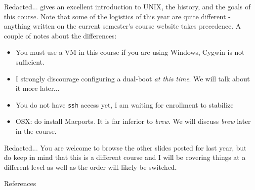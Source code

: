 \begin{frame}{Redacted...}
  \href{http://www.cs.cornell.edu/courses/cs2043/2015sp/lectures/lecture01.pdf}{}
  gives an excellent introduction to UNIX, the history, and the goals of this course. Note that some of the
  logistics of this year are quite different \-- anything written on the current semester's course website
  takes precedence.  A couple of notes about the differences:

  \begin{itemize}
    \item You must use a VM in this course if you are using Windows, Cygwin is not sufficient.
    \item I strongly discourage configuring a dual-boot \emph{at this time}.  We will talk about it more later...
    \item You do not have \texttt{ssh} access yet, I am waiting for enrollment to stabilize
    \item OSX: do  install Macports.  It is far inferior to \emph{brew}.  We will discuss \emph{brew}
          later in the course.
  \end{itemize}
\end{frame}

\begin{frame}{Redacted...}
  You are welcome to browse the other slides posted for last year, but do keep in mind that this is a different
  course and I will be covering things at a different level as well as the order will likely be switched.
\end{frame}

%

\begin{frame}[allowframebreaks]{References}
  
  
\end{frame}


